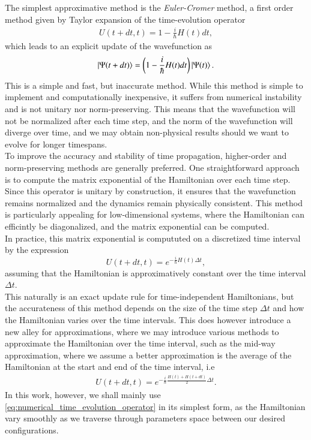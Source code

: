 \documentclass{subfiles}
\begin{document}
The simplest approximative method is the \emph{Euler-Cromer} method, a first order method given by Taylor expansion of the time-evolution operator
\begin{align}
    U(t + dt, t) = 1 - \frac{i}{\hbar}H(t)dt\label{eq:euler_cromer},
\end{align}
which leads to an explicit update of the wavefunction as 
\begin{align*}
    \ket{\Psi(t + dt)} = \bigg(1 - \frac{i}{\hbar}H(t)dt\bigg)\ket{\Psi(t)}.
\end{align*}
This is a simple and fast, but inaccurate method. While this method is simple to implement and computationally inexpensive, it suffers from numerical instability and is not unitary nor norm-preserving. This means that the wavefunction will not be normalized after each time step, and the norm of the wavefunction will diverge over time, and we may obtain non-physical results should we want to evolve for longer timespans. \\ 
To improve the accuracy and stability of time propagation, higher-order and norm-preserving methods are generally preferred. One straightforward approach is to compute the matrix exponential of the Hamiltonian over each time step. Since this operator is unitary by construction, it ensures that the wavefunction remains normalized and the dynamics remain physically consistent. This method is particularly appealing for low-dimensional systems, where the Hamiltonian can efficintly be diagonalized, and the matrix exponential can be computed. \\

In practice, this matrix exponential is compututed on a discretized time interval by the expression
\begin{equation}
    U(t + dt, t) = e^{-\frac{i}{\hbar}H(t)\Delta t}\label{eq:numerical_time_evolution_operator},
\end{equation}
assuming that the Hamiltonian is approximatively constant over the time interval $\Delta t$. \\

This naturally is an exact update rule for time-independent Hamiltonians, but the accurateness of this method depends on the size of the time step $\Delta t$ and how the Hamiltonian varies over the time intervals. This does however introduce a new alley for approximations, where we may introduce various methods to approximate the Hamiltonian over the time interval, such as the mid-way approximation, where we assume a better approximation is the average of the Hamiltonian at the start and end of the time interval, i.e
\begin{align*}
    U(t + dt, t) = e^{-\frac{i}{\hbar}\frac{H(t) + H(t + dt)}{2}\Delta t}.
\end{align*}
In this work, however, we shall mainly use \eqref{eq:numerical_time_evolution_operator} in its simplest form, as the Hamiltonian vary smoothly as we traverse  through parameters space between our desired configurations.\\ 
\end{document}
